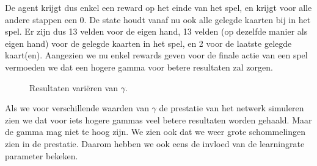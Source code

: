 \documentclass[11pt]{article}
\begin{document}
\noindent De agent krijgt dus enkel een reward op het einde van het spel, en krijgt voor alle andere stappen een 0. De state houdt vanaf nu ook alle gelegde kaarten bij in het spel. Er zijn dus 13 velden voor de eigen hand, 13 velden (op dezelfde manier als eigen hand) voor de gelegde kaarten in het spel, en 2 voor de laatste gelegde kaart(en). Aangezien we nu enkel rewards geven voor de finale actie van een spel vermoeden we dat een hogere gamma voor betere resultaten zal zorgen.\\
\begin{figure}[H]
    \centering
    \qquad
    \caption{Resultaten variëren van $\gamma$.}
\end{figure}
\noindent Als we voor verschillende waarden van $\gamma$ de prestatie van het netwerk simuleren zien we dat voor iets hogere gammas veel betere resultaten worden gehaald. Maar de gamma mag niet te hoog zijn. We zien ook dat we weer grote schommelingen zien in de prestatie. Daarom hebben we ook eens de invloed van de learningrate parameter bekeken. 
\end{document}
